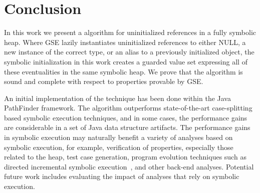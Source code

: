\section{Conclusion}

In this work we present a \symtxt{} algorithm for uninitialized
references in a fully symbolic heap. Where GSE lazily instantiates
uninitialized references to either NULL, a new instance of the correct
type, or an alias to a previously initialized object, the symbolic
initialization in this work creates a guarded value set expressing all
of these eventualities in the same symbolic heap. We prove that the
\symtxt{} algorithm is sound and complete with respect to properties
provable by GSE.

An initial implementation of the technique has been done within the
Java PathFinder framework. The \symtxt{} algorithm outperforms
state-of-the-art case-splitting based symbolic execution techniques,
and in some cases, the performance gains are considerable in a set of
Java data structure artifacts. The performance gains in symbolic
execution may naturally benefit a variety of analyses based on
symbolic execution, for example, verification of properties,
especially those related to the heap, test case generation, program
evolution techniques such as directed incremental symbolic
execution~\cite{person:pldi2011}, and other back-end
analyses. Potential future work includes evaluating the impact of
analyses that rely on symbolic execution.

